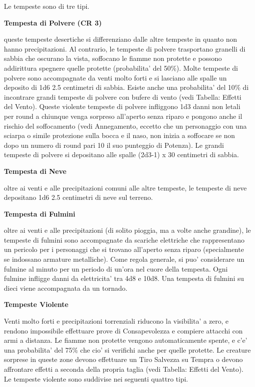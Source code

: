 \documentclass[a4paper,11pt,twoside,openany]{book}
\begin{document}
{Le tempeste sono di tre tipi.

\textbf{Tempesta di Polvere (CR 3)}

queste tempeste desertiche si differenziano dalle altre tempeste in quanto non hanno precipitazioni. Al contrario, le tempeste di polvere trasportano granelli di sabbia che oscurano la vista, soffocano le fiamme non protette e possono addirittura spegnere quelle protette (probabilita' del 50\%). Molte tempeste di polvere sono accompagnate da venti molto forti e si lasciano alle spalle un deposito di 1d6 \texttimes{} 2.5 centimetri di sabbia.
Esiste anche una probabilita' del 10\% di incontrare grandi tempeste di polvere con bufere di vento (vedi Tabella: Effetti del Vento). Queste violente tempeste di polvere infliggono 1d3 danni non letali per round a chiunque venga sorpreso all'aperto senza riparo e pongono anche il rischio del soffocamento (vedi Annegamento, eccetto che un personaggio con una sciarpa o simile protezione sulla bocca e il naso, non inizia a soffocare se non dopo un numero di round pari 10 \texttimes{} il suo punteggio di Potenza). Le grandi tempeste di polvere si depositano alle spalle (2d3-1) x 30 centimetri di sabbia.

\textbf{Tempesta di Neve}

oltre ai venti e alle precipitazioni comuni alle altre tempeste, le tempeste di neve depositano 1d6 \texttimes{} 2.5 centimetri di neve sul terreno.

\textbf{Tempesta di Fulmini}

oltre ai venti e alle precipitazioni (di solito pioggia, ma a volte anche grandine), le tempeste di fulmini sono accompagnate da scariche elettriche che rappresentano un pericolo per i personaggi che si trovano all'aperto senza riparo (specialmente se indossano armature metalliche). Come regola generale, si puo' considerare un fulmine al minuto per un periodo di un'ora nel cuore della tempesta. Ogni fulmine infligge danni da elettricita' tra 4d8 e 10d8. Una tempesta di fulmini su dieci viene accompagnata da un tornado.

\textbf{Tempeste Violente}

Venti molto forti e precipitazioni torrenziali riducono la visibilita' a zero, e rendono impossibile effettuare prove di Consapevolezza e compiere attacchi con armi a distanza. Le fiamme non protette vengono automaticamente spente, e c'e' una probabilita' del 75\% che cio' si verifichi anche per quelle protette. Le creature sorprese in queste zone devono effettuare un Tiro Salvezza su Tempra o devono affrontare effetti a seconda della propria taglia (vedi Tabella: Effetti del Vento). Le tempeste violente sono suddivise nei seguenti quattro tipi.

}
\end{document}
